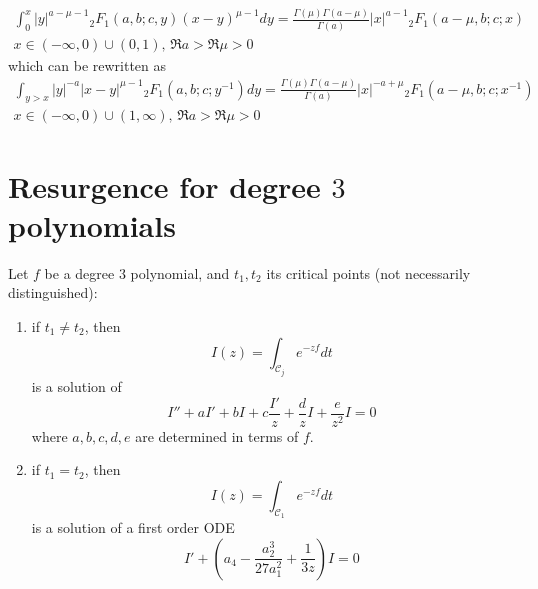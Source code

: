 \documentclass[11pt,a4paper,twoside,leqno,noamsfonts]{amsart}
\numberwithin{equation}{section}
\begin{document}
\begin{multline}
\label{4.5}
\int_0^x |y|^{a-\mu-1}{}_2F_1\left(a,b;c,y\right)(x-y)^{\mu-1}dy=\frac{\Gamma(\mu)\Gamma(a-\mu)}{\Gamma(a)}|x|^{a-1}{}_2F_1\left(a-\mu,b;c;x\right)\\
x\in(-\infty,0)\cup(0,1), \, \Re a>\Re\mu>0
\end{multline}
which can be rewritten as 
\begin{multline}
\label{4.8}
\int_{y>x}|y|^{-a}|x-y|^{\mu-1}{}_2F_1\left(a,b;c;y^{-1}\right)dy=\frac{\Gamma(\mu)\Gamma(a-\mu)}{\Gamma(a)}|x|^{-a+\mu}{}_2F_1\left(a-\mu,b;c;x^{-1}\right)\\
x\in(-\infty,0)\cup(1,\infty), \, \Re a>\Re\mu>0
\end{multline}
%
%

\section{Resurgence for degree $3$ polynomials}

Let $f$ be a degree $3$ polynomial, and $t_{1},t_{2}$ its critical points (not necessarily distinguished):
\begin{enumerate}
\item if $t_{1}\neq t_{2}$, then 
\[I(z)=\int_{\mathcal{C}_{j}}e^{-zf}dt\]
is a solution of 
\begin{equation}
\label{eq:I for p not 0}
 I''+a I'+bI+c\frac{I'}{z}+\frac{d}{z}I+\frac{e}{z^2}I=0
\end{equation}
where $a,b,c,d,e$ are determined in terms of $f$.
\item if $t_{1}=t_2$, then 
\[I(z)=\int_{\mathcal{C}_{1}}e^{-zf}dt\]
is a solution of a first order ODE
\begin{equation}
I'+\left(a_4-\frac{a_2^3}{27a_1^2}+\frac{1}{3z}\right)I=0
\end{equation}
\end{enumerate}
\end{document}
